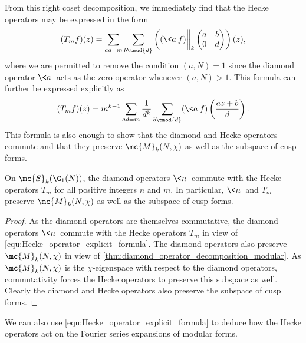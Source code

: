 \documentclass[12pt]{article}
\begin{document}
      From this right coset decomposition, we immediately find that the Hecke operators may be expressed in the form
      \begin{equation}\label{equ:Hecke_operator_right_coset_formula}
        (T_{m}f)(z) = \sum_{ad = m}\sum_{b \tmod{d}}\left((\<a\>f)\bigg\|_{k}\begin{pmatrix} a & b \\ 0 & d \end{pmatrix}\right)(z),
      \end{equation}
      where we are permitted to remove the condition \((a,N) = 1\) since the diamond operator \(\<a\>\) acts as the zero operator whenever \((a,N) > 1\). This formula can further be expressed explicitly as
      \begin{equation}\label{equ:Hecke_operator_explicit_formula}
        (T_{m}f)(z) = m^{k-1}\sum_{ad = m}\frac{1}{d^{k}}\sum_{b \tmod{d}}(\<a\>f)\left(\frac{az+b}{d}\right).
      \end{equation}
      This formula is also enough to show that the diamond and Hecke operators commute and that they preserve \(\mc{M}_{k}(N,\chi)\) as well as the subspace of cusp forms.

      \begin{proposition}
        On \(\mc{S}_{k}(\G_{1}(N))\), the diamond operators \(\<n\>\) commute with the Hecke operators \(T_{m}\) for all positive integers \(n\) and \(m\). In particular, \(\<n\>\) and \(T_{m}\) preserve \(\mc{M}_{k}(N,\chi)\) as well as the subspace of cusp forms.
      \end{proposition}
      \begin{proof}
        As the diamond operators are themselves commutative, the diamond operators \(\<n\>\) commute with the Hecke operators \(T_{m}\) in view of \cref{equ:Hecke_operator_explicit_formula}. The diamond operators also preserve \(\mc{M}_{k}(N,\chi)\) in view of \cref{thm:diamond_operator_decomposition_modular}. As \(\mc{M}_{k}(N,\chi)\) is the \(\chi\)-eigenspace with respect to the diamond operators, commutativity forces the Hecke operators to preserve this subspace as well. Clearly the diamond and Hecke operators also preserve the subspace of cusp forms.
      \end{proof}
      
      We can also use \cref{equ:Hecke_operator_explicit_formula} to deduce how the Hecke operators act on the Fourier series expansions of modular forms.
\end{document}
